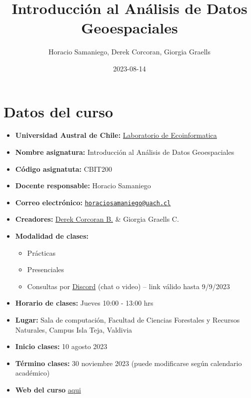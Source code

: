 \documentclass[
]{book}
\title{Introducción al Análisis de Datos Geoespaciales}
\author{Horacio Samaniego, Derek Corcoran, Giorgia Graells}
\date{2023-08-14}
\providecommand{\tightlist}{%
  \setlength{\itemsep}{0pt}\setlength{\parskip}{0pt}}
\begin{document}
\maketitle

{
\setcounter{tocdepth}{1}
\tableofcontents
}
\hypertarget{datos-del-curso}{%
\chapter{Datos del curso}\label{datos-del-curso}}

\begin{itemize}
\tightlist
\item
  \textbf{Universidad Austral de Chile:} \href{http://www.ecoinformatica.cl}{Laboratorio de Ecoinformatica}
\item
  \textbf{Nombre asignatura:} Introducción al Análisis de Datos Geoespaciales
\item
  \textbf{Código asignatuta:} CBIT200
\item
  \textbf{Docente responsable:} Horacio Samaniego
\item
  \textbf{Correo electrónico:} \href{mailto:horaciosamaniego@uach.cl}{\nolinkurl{horaciosamaniego@uach.cl}}
\item
  \textbf{Creadores:} \href{https://derek-corcoran-barrios.github.io/}{Derek Corcoran B.} \& Giorgia Graells C.
\item
  \textbf{Modalidad de clases:}

  \begin{itemize}
  \tightlist
  \item
    Prácticas
  \item
    Presenciales
  \item
    Consultas por \href{https://discord.gg/TWGvq53tm}{Discord} (chat o video) -- link válido hasta 9/9/2023
  \end{itemize}
\item
  \textbf{Horario de clases:} Jueves 10:00 - 13:00 hrs
\item
  \textbf{Lugar:} Sala de computación, Facultad de Ciencias Forestales y Recursos Naturales, Campus Isla Teja, Valdivia
\item
  \textbf{Inicio clases:} 10 agosto 2023
\item
  \textbf{Término clases:} 30 noviembre 2023 (puede modificarse según calendario académico)
\item
  \textbf{Web del curso} \href{https://cbit200-programacion-geoespacial.github.io/}{aqui}
\end{itemize}
\end{document}
